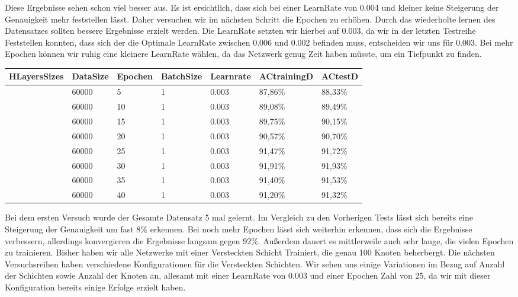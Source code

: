 \documentclass[12pt]{article}
\begin{document}
	Diese Ergebnisse sehen schon viel besser aus. Es ist ersichtlich, dass sich bei einer LearnRate von 0.004 und kleiner keine Steigerung der Genauigkeit mehr feststellen lässt. Daher versuchen wir im nächsten Schritt die Epochen zu erhöhen. Durch das wiederholte lernen des Datensatzes sollten bessere Ergebnisse erzielt werden. Die LearnRate setzten wir hierbei auf 0.003, da wir in der letzten Testreihe Feststellen konnten, dass sich der die Optimale LearnRate zwischen 0.006 und 0.002 befinden muss, entscheiden wir uns für 0.003. Bei mehr Epochen können wir ruhig eine kleinere LearnRate wählen, da das Netzwerk genug Zeit haben müsste, um ein Tiefpunkt zu finden.
\begin{table}[H]
    \centering
    \begin{tabular}{|l|l|l|l|l|l|l|}
    \hline
        HLayersSizes & DataSize & Epochen & BatchSize & Learnrate & ACtrainingD & ACtestD \\ \hline
        [784, 100, 10] & 60000 & 5 & 1 & 0.003 & 87,86\% & 88,33\% \\ \hline
        [784, 100, 10] & 60000 & 10 & 1 & 0.003 & 89,08\% & 89,49\% \\ \hline
        [784, 100, 10] & 60000 & 15 & 1 & 0.003 & 89,75\% & 90,15\% \\ \hline
        [784, 100, 10] & 60000 & 20 & 1 & 0.003 & 90,57\% & 90,70\% \\ \hline
        [784, 100, 10] & 60000 & 25 & 1 & 0.003 & 91,47\% & 91,72\% \\ \hline
        [784, 100, 10] & 60000 & 30 & 1 & 0.003 & 91,91\% & 91,93\% \\ \hline
        [784, 100, 10] & 60000 & 35 & 1 & 0.003 & 91,40\% & 91,53\% \\ \hline
        [784, 100, 10] & 60000 & 40 & 1 & 0.003 & 91,20\% & 91,32\% \\ \hline
    \end{tabular}
\end{table}
Bei dem ersten Versuch wurde der Gesamte Datensatz 5 mal gelernt. Im Vergleich zu den Vorherigen Tests lässt sich bereits eine Steigerung der Genauigkeit um fast 8\% erkennen. Bei noch mehr Epochen lässt sich weiterhin erkennen, dass sich die Ergebnisse verbessern, allerdings konvergieren die Ergebnisse langsam gegen 92\%. Außerdem dauert es mittlerweile auch sehr lange, die vielen Epochen zu trainieren. Bisher haben wir alle Netzwerke mit einer Versteckten Schicht Trainiert, die genau 100 Knoten beherbergt. Die nächsten Versuchsreihen haben verschiedene Konfigurationen für die Versteckten Schichten. Wir sehen uns einige Variationen im Bezug auf Anzahl der Schichten sowie Anzahl der Knoten an, allesamt mit einer LearnRate von 0.003 und einer Epochen Zahl von 25, da wir mit dieser Konfiguration bereits einige Erfolge erzielt haben. 
\end{document}
